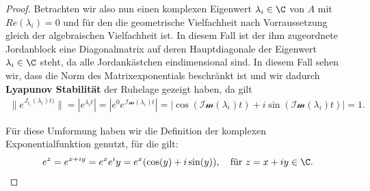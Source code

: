 \documentclass[letterpaper,10pt,english]{jupyterBook}
\begin{document}
\begin{proof}
\par
Betrachten wir also nun einen komplexen Eigenwert \(\lambda_i \in \C\) von \(A\) mit \(Re(\lambda_i)=0\) und für den die geometrische Vielfachheit nach Vorraussetzung gleich der algebraischen Vielfachheit ist.
In diesem Fall ist der ihm zugeordnete Jordanblock eine Diagonalmatrix auf deren Hauptdiagonale der Eigenwert \(\lambda_i \in \C\) steht, da alle Jordankästchen eindimensional sind.
In diesem Fall sehen wir, dass die Norm des Matrixexponentials beschränkt ist und wir dadurch \textbf{Lyapunov Stabilität} der Ruhelage gezeigt haben, da gilt
\begin{align*}
\|e^{J_{r_i}(\lambda_i)t)}\| = |e^{\lambda_i t}| = |e^0e^{\mathcal{Im}(\lambda_i) t}| = |\cos{(\mathcal{Im}(\lambda_i)t)} + i \sin{(\mathcal{Im}(\lambda_i)t)}| = 1.
\end{align*}
\par
Für diese Umformung haben wir die Definition der komplexen Exponentialfunktion genutzt, für die gilt:
\begin{align*}
e^z = e^{x+iy} = e^xe^iy = e^x(\cos(y) + i\sin(y)), \quad \text{für } z = x+iy \in \C.
\end{align*}\end{proof}
\end{document}
